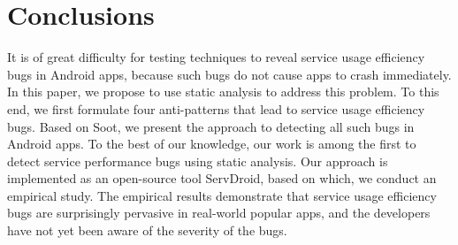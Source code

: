 \documentclass[sigconf,review, anonymous]{acmart}
\begin{document}
\section{Conclusions}\label{conclusion}
It is of great difficulty for testing techniques to reveal service usage efficiency bugs in Android apps, because such bugs do not cause apps to crash immediately. In this paper, we propose to use static analysis to address this problem. To this end, we first formulate four anti-patterns that lead to service usage efficiency bugs. Based on {\sf Soot}, we present the approach to detecting all such bugs in Android apps. To the best of our knowledge, our work is among the first to detect service performance bugs using static analysis. Our approach is implemented as an open-source tool {\sf ServDroid}, based on which, we conduct an empirical study. The empirical results demonstrate that service usage efficiency bugs are surprisingly pervasive in real-world popular apps, and the developers have not yet been aware of the severity of the bugs.  
    

 
\end{document}
